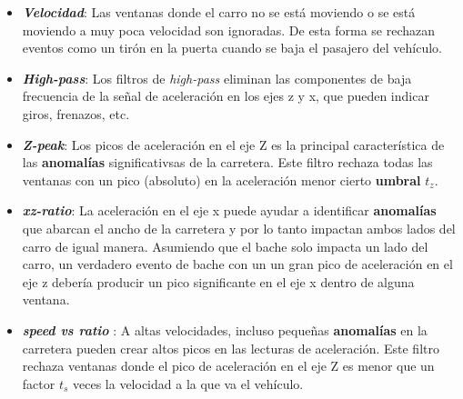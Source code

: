 		\begin{itemize}
			\item \emph{\textbf {Velocidad}}: Las ventanas donde el carro no se está moviendo o se está moviendo a muy poca velocidad son ignoradas. 
				De esta forma se rechazan eventos como un tirón en la puerta cuando se baja el pasajero del vehículo.\\
			\item \emph{\textbf {High-pass}}: Los filtros de \emph{high-pass} eliminan las componentes de baja frecuencia de la señal de aceleración
				en los ejes z y x, que pueden indicar giros, frenazos, etc.\\
			\item  \emph{\textbf {Z-peak}}: Los picos de aceleración en el eje Z es la principal característica de las \textbf{anomalías} significativsas de
				la carretera. Este filtro rechaza todas las ventanas con un pico (absoluto) en la aceleración menor cierto \textbf{umbral} $t_z$.\\
			\item \emph{\textbf {xz-ratio}}: La aceleración en el eje x puede ayudar a identificar \textbf{anomalías} que abarcan el ancho de la carretera
				y por lo tanto impactan ambos lados del carro de igual manera.  Asumiendo que el bache solo impacta un lado del carro, un verdadero
				evento de bache con un un gran pico de aceleración en el eje z debería producir un pico significante en el eje x dentro de alguna
				ventana.\\
			\item \emph{\textbf {speed vs ratio }}:	A altas velocidades, incluso pequeñas \textbf{anomalías} en la carretera pueden crear altos picos en las
				lecturas de aceleración. Este filtro rechaza ventanas donde el pico de aceleración en el eje Z es menor que un factor $t_s$ veces la
				velocidad a la que va el vehículo.
		\end{itemize}


